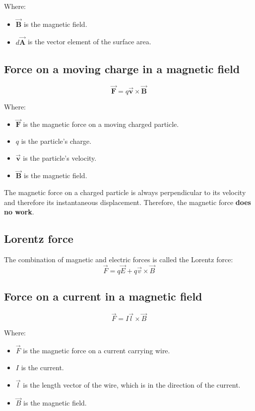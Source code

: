 \documentclass[11pt]{article}
\begin{document}
Where:
\begin{itemize}
\item \(\vec{\boldsymbol{B}}\) is the magnetic field.
\item \(d \vec{\boldsymbol{A}}\) is the vector element of the surface area.
\end{itemize}

\newpage
\subsection{Force on a moving charge in a magnetic field}
\label{sec:orgfb3a74b}
\[\vec{\boldsymbol{F}} = q \vec{\boldsymbol{v}} \times \vec{\boldsymbol{B}}\]

Where:
\begin{itemize}
\item \(\vec{\boldsymbol{F}}\) is the magnetic force on a moving charged particle.
\item \(q\) is the particle's charge.
\item \(\vec{\boldsymbol{v}}\) is the particle's velocity.
\item \(\vec{\boldsymbol{B}}\) is the magnetic field.
\end{itemize}

The magnetic force on a charged particle is always perpendicular to its velocity and therefore its instantaneous displacement. Therefore, the magnetic force \textbf{does no work}.
\subsection{Lorentz force}
\label{sec:orgded848d}
The combination of magnetic and electric forces is called the Lorentz force:
\[\vec{F} = q \vec{E} + q \vec{v} \times \vec{B}\]
\subsection{Force on a current in a magnetic field}
\label{sec:orgbd705ba}
\[\vec{F} = I \vec{l} \times \vec{B}\]

Where:
\begin{itemize}
\item \(\vec{F}\) is the magnetic force on a current carrying wire.
\item \(I\) is the current.
\item \(\vec{l}\) is the length vector of the wire, which is in the direction of the current.
\item \(\vec{B}\) is the magnetic field.
\end{itemize}
\end{document}

